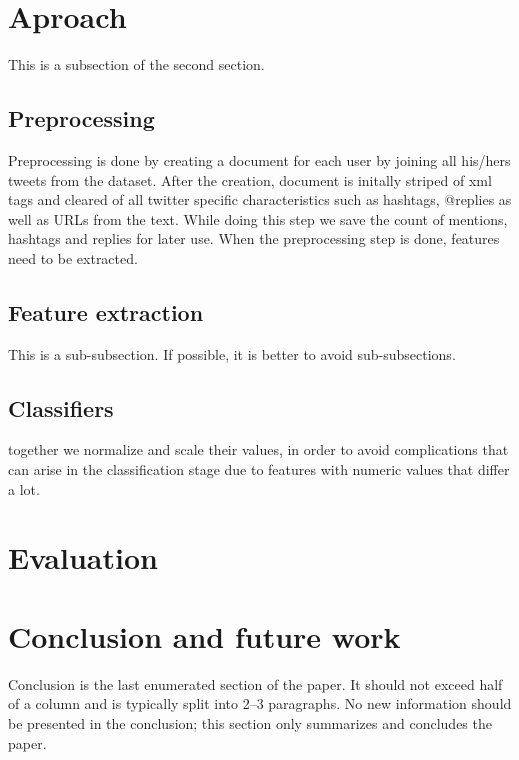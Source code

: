 \documentclass[10pt, a4paper]{article}
\begin{document}
\section{Aproach}


This is a subsection of the second section.

\subsection{Preprocessing}

Preprocessing is done by creating a document for each user by joining all his/hers tweets from the dataset. After the creation, document is initally striped of xml tags and cleared of all twitter specific characteristics such as hashtags, @replies as well as URLs from the text. While doing this step we save the count of mentions, hashtags and replies for later use. When the preprocessing step is done, features need to be extracted. 

\subsection{Feature extraction} 

This is a sub-subsection. If possible, it is better to avoid sub-subsections. 

\subsection{Classifiers}

together we normalize and scale their values, in order to avoid complications that can
arise in the classification stage due to features with numeric values that differ a lot.



\section{Evaluation}



\section{Conclusion and future work}

Conclusion is the last enumerated section of the paper. It should not exceed half of a column and is typically split into 2--3 paragraphs. No new information should be presented in the conclusion; this section only summarizes and concludes the paper.



 
\end{document}
